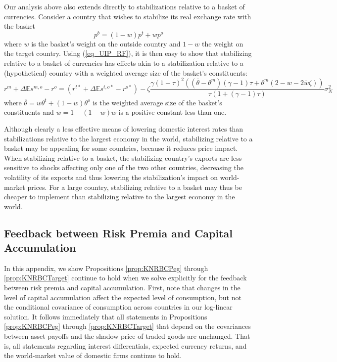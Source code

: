 Our analysis above also extends directly to stabilizations relative to
a basket of currencies. Consider a country that wishes to stabilize
its real exchange rate with the basket
\begin{equation*}
  p^b = (1 - w) p^t + w p^o
\end{equation*}
where $w$ is the basket's weight on the outside country and $1 - w$
the weight on the target country. Using (\ref{eq_UIP_RF}), it is then
easy to show that stabilizing relative to a basket of currencies has
effects akin to a stabilization relative to a (hypothetical) country
with a weighted average size of the basket's constituents:
\begin{equation*}
  r^m + \Delta\mathbb{E} s^{m,o} - r^o =  
  \left(r^{t \ast} + \Delta\mathbb{E}s^{t, o \ast} - r^{o \ast} \right) - \zeta \frac{\gamma (1 - \tau)^2 \left( (\bar{\theta} - \theta^m) (\gamma - 1) \tau + \theta^m (2 - w - 2 \bar{w} \zeta) \right)}{\tau \left( 1 + (\gamma - 1) \tau \right)} \sigma_N^2
\end{equation*}
where $\bar{\theta} = w \theta^t + (1 - w) \theta^o$ is the weighted
average size of the basket's constituents and
$\bar{w} = 1 - (1 - w) w$ is a positive constant less than one.

Although clearly a less effective means of lowering domestic interest
rates than stabilizations relative to the largest economy in the
world, stabilizing relative to a basket may be appealing for some
countries, because it reduces price impact. When stabilizing relative
to a basket, the stabilizing country's exports are less sensitive to
shocks affecting only one of the two other countries, decreasing the
volatility of its exports and thus lowering the stabilization's impact
on world-market prices. For a large country, stabilizing relative to a
basket may thus be cheaper to implement than stabilizing relative to
the largest economy in the world.


\subsection{Feedback between Risk Premia and Capital
  Accumulation \label{Appendix_EndogenousCapital}}


In this appendix, we show Propositions \ref{prop:KNRBCPeg} through
\ref{prop:KNRBCTarget} continue to hold when we solve explicitly for
the feedback between risk premia and capital accumulation. First, note
that changes in the level of capital accumulation affect the expected
level of consumption, but not the conditional covariance of
consumption across countries in our log-linear solution. It follows
immediately that all statements in Propositions \ref{prop:KNRBCPeg}
through \ref{prop:KNRBCTarget} that depend on the covariances between
asset payoffs and the shadow price of traded goods are unchanged. That
is, all statements regarding interest differentials, expected currency
returns, and the world-market value of domestic firms continue to
hold.

